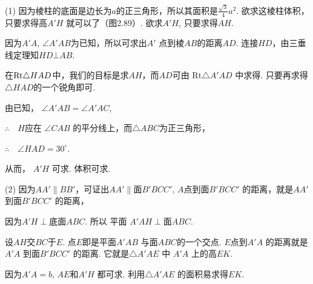 \begin{analyze}
(1) 因为棱柱的底面是边长为$a$的正三角形，所以其面积是$\frac{\sqrt{3}}{4}a^{2}$. 欲求这棱柱体积，只要求得高$A'H$ 就可以了（图2.89）. 欲求$A'H$, 只要求得$AH$.

因为$A'A$, $\angle A'AB$为已知，所以可求出$A'$ 点到棱$AB$的距离$AD$. 连接$HD$，由三垂线定理知$HD\bot AB$.

在${\rm Rt}\triangle HAD$中，我们的目标是求$AH$，而$AD$可由
$\mathrm{Rt}\triangle A'AD$ 中求得. 只要再求得$\triangle HAD$的一个锐角即可.

由已知，
$\angle A'AB=\angle A'AC$,

$\therefore\quad  H$应在 $\angle CAB$ 的平分线上，而$\triangle ABC$为正三角形，

$\therefore\quad \angle HAD=30^{\circ}$.

从而， $A'H$ 可求. 体积可求.

\begin{figure}[htp]
    \centering
{}
    \caption{}
\end{figure}


(2) 因为$AA'\parallel BB'$，可证出$AA'\parallel  \text{面} B'BCC'$, $A$点到面$B'BCC'$ 的距离，就是$AA'$ 到面$B'BCC'$ 的距离，

因为$A'H\perp \text{底面} ABC$. 所以 平面 $A'AH\perp \text{面} ABC$.  

设$AH$交$BC$于$E$. 点$E$即是平面$A'AB$ 与面$ABC$的一个交点. $E$点到$A'A$ 的距离就是$A'A$ 到面$B'BCC'$ 的距离. 它就是$\triangle A'AE$ 中 $A'A$ 上的高$EK$.

因为$A'A=b$, $AE$和$A'H$ 都可求. 利用$\triangle A'AE$ 的面积易求得$EK$.
\end{analyze}


